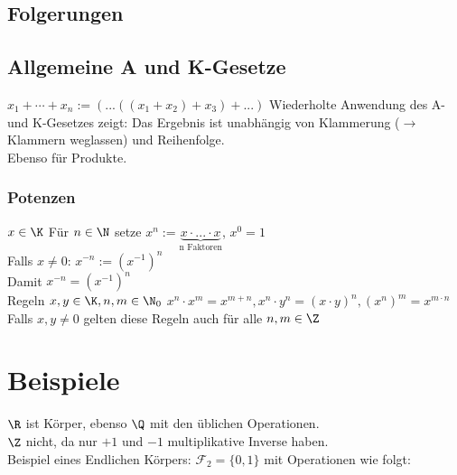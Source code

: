 %
\subsection{Folgerungen}
\subsection*{Allgemeine A und K-Gesetze}
$x_1 + \cdots + x_n := (...((x_1 + x_2) + x_3) + ...)$
Wiederholte Anwendung des A- und K-Gesetzes zeigt: Das Ergebnis ist unabhängig von Klammerung ($\to$ Klammern weglassen) und Reihenfolge.\\
Ebenso für Produkte.\\
\subsubsection*{Potenzen}
$x\in \K$ Für $n \in \N$ setze $x^n := \underbrace{x\cdot ... \cdot x}_{\text{n Faktoren}}$, $x^0 = 1$\\
Falls $x \neq 0$: $x^{-n} := (x^{-1})^n$\\
Damit $x^{-n} = (x^{-1})^n$\\
Regeln $x,y \in \K, n, m \in \N_0$
$x^n\cdot x^m = x^{m+n}, x^n\cdot y^n = (x\cdot y)^n, (x^n)^m = x^{m\cdot n}$\\
Falls $x,y \neq 0$ gelten diese Regeln auch für alle $n, m \in \Z$
\section*{Beispiele}
$\R$ ist Körper, ebenso $\Q$ mit den üblichen Operationen.\\
$\Z$ nicht, da nur $+1$ und $-1$ multiplikative Inverse haben.\\
Beispiel eines Endlichen Körpers:
$\mathcal{F}_2 = \{0,1\}$ mit Operationen wie folgt:\\

